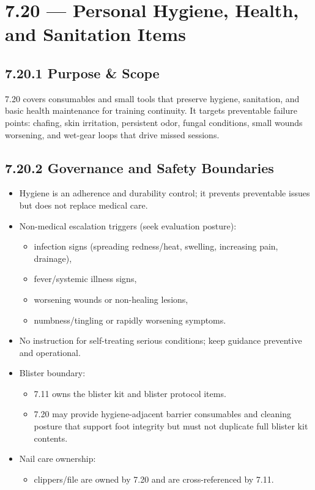\documentclass[10pt]{article}
\begin{document}
\section*{7.20 — Personal Hygiene, Health, and Sanitation Items}
{}

\subsection*{7.20.1 Purpose \& Scope}
{}

7.20 covers consumables and small tools that preserve hygiene, sanitation, and basic health maintenance for training continuity. It targets preventable failure points: chafing, skin irritation, persistent odor, fungal conditions, small wounds worsening, and wet-gear loops that drive missed sessions.

\subsection*{7.20.2 Governance and Safety Boundaries}
{}

\begin{itemize}
\item Hygiene is an adherence and durability control; it prevents preventable issues but does not replace medical care.
\item Non-medical escalation triggers (seek evaluation posture):
  \begin{itemize}
  \item infection signs (spreading redness/heat, swelling, increasing pain, drainage),
  \item fever/systemic illness signs,
  \item worsening wounds or non-healing lesions,
  \item numbness/tingling or rapidly worsening symptoms.
  \end{itemize}
\item No instruction for self-treating serious conditions; keep guidance preventive and operational.
\item Blister boundary:
  \begin{itemize}
  \item 7.11 owns the blister kit and blister protocol items.
  \item 7.20 may provide hygiene-adjacent barrier consumables and cleaning posture that support foot integrity but must not duplicate full blister kit contents.
  \end{itemize}
\item Nail care ownership:
  \begin{itemize}
  \item clippers/file are owned by 7.20 and are cross-referenced by 7.11.
  \end{itemize}
\end{itemize}
\end{document}
